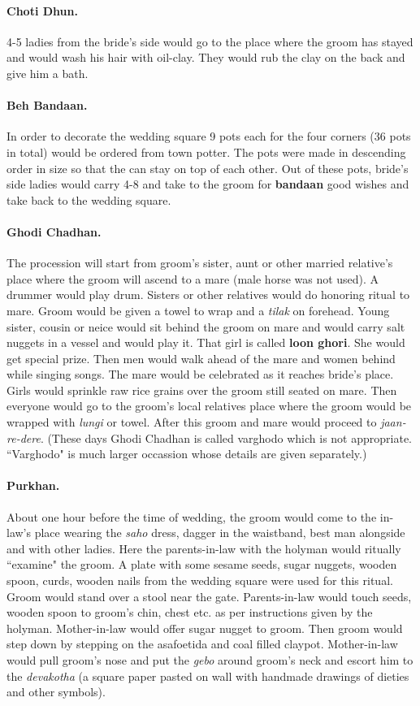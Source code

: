 \paragraph{Choti Dhun.} 4-5 ladies from the bride's side would go to the place
where the groom has stayed and would wash his hair with oil-clay. They would
rub the clay on the back and give him a bath.

\paragraph{Beh Bandaan.} In order to decorate the wedding square 9 pots each
for the four corners (36 pots in total) would be ordered from town potter. The
pots were made in descending order in size so that the can stay on top of each
other. Out of these pots, bride's side ladies would carry 4-8 and take to the
groom for \textbf{bandaan} good wishes and take back to the wedding square.

\paragraph{Ghodi Chadhan.} The procession will start from groom's sister, aunt
or other married relative's place where the groom will ascend to a mare (male
horse was not used). A drummer would play drum. Sisters or other
relatives would do honoring ritual to mare. Groom would be given a towel to
wrap and a \textit{tilak} on forehead. Young sister, cousin or neice would sit
behind the groom on mare and would carry salt nuggets in a vessel and would
play it. That girl is called \textbf{loon ghori}. She would get special prize.
Then men would walk ahead of the mare and women behind while singing songs. The
mare would be celebrated as it reaches bride's place. Girls would sprinkle raw
rice grains over the groom still seated on mare. Then everyone would go to the
groom's local relatives place where the groom would be wrapped with
\textit{lungi} or towel. After this groom and mare would proceed to
\textit{jaan-re-dere}. (These days Ghodi Chadhan is called varghodo which is
not appropriate. ``Varghodo" is much larger occassion whose details are
given separately.)

\paragraph{Purkhan.} About one hour before the time of wedding, the groom would
come to the in-law's place wearing the \textit{saho} dress, dagger in the
waistband, best man alongside and with other ladies. Here the parents-in-law
with the holyman would ritually ``examine" the groom. A plate with some sesame
seeds, sugar nuggets, wooden spoon, curds, wooden nails from the wedding square
were used for this ritual. Groom would stand over a stool near the gate.
Parents-in-law would touch seeds, wooden spoon to groom's chin, chest etc. as
per instructions given by the holyman. Mother-in-law would offer sugar nugget
to groom. Then groom would step down by stepping on the asafoetida and coal
filled claypot. Mother-in-law would pull groom's nose and put the \textit{gebo}
around groom's neck and escort him to the \textit{devakotha} (a square paper
pasted on wall with handmade drawings of dieties and other symbols).

